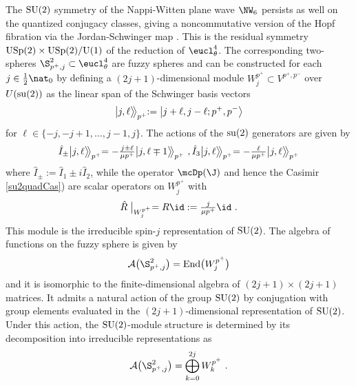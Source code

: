 The ${\rm SU}(2)$ symmetry of the Nappi-Witten plane wave $\NW_6$
persists as well on the quantized conjugacy classes, giving a
noncommutative version of the Hopf fibration via the Jordan-Schwinger
map \cite{G-BLMV1,HLS-J1}. This is the residual symmetry ${\rm
  USp}(2)\times{\rm USp}(2) / {\rm U}(1)$ of the reduction of
$\eucl_\theta^4$. The corresponding
two-spheres $\S_{p^+,j}^2\subset\eucl_\theta^4$ are fuzzy spheres and
can be constructed for each $j\in\frac12 \nat_0$ by defining a
$(2j+1)$-dimensional module $W^{p^+}_j\subset V^{p^+,p^-}$ over
$U({\rm su}(2))$ as the linear span of the Schwinger basis vectors
\begin{equation}
\bigl|j,\ell \bigr\rangle\!\!\!
\bigm\rangle_{p^+}:=\bigl|j+\ell,j-\ell;p^+,p^-\bigr\rangle
\label{fuzzybasisdef}\end{equation}
for $\ell\in\{-j,-j+1,\dots,j-1,j\}$. The actions of the ${\rm su}(2)$
generators are given by
\begin{equation}
\hat I_\pm\bigl|j,\ell \bigr\rangle\!\!\!
\bigm\rangle_{p^+}=-\mbox{$\frac{j\pm\ell}
{\mu p^+}$} \bigl|j,\ell\mp1 \bigr\rangle\!\!\!\bigm\rangle_{p^+} \ ,   
\hat I_3\bigl|j,\ell \bigr\rangle\!\!\!\bigm\rangle_{p^+}
=-\mbox{$\frac\ell{\mu p^+}$} 
\bigl|j,\ell \bigr\rangle\!\!\!\bigm\rangle_{p^+}
\label{su2irrepaction}\end{equation}
where $\hat I_\pm:=\hat I_1\pm i\hat I_2$, while the operator
$\mcDp(\J )$ and hence the Casimir \eqref{su2quadCas}) are scalar
operators on $W_j^{p^+}$ with
\begin{equation}
\hat R\bigm|_{W_j^{p^+}}=R \id:=\mbox{$\frac j{\mu p^+}$} \id \ .
\label{quadCasscalar}\end{equation}
This module is the irreducible spin-$j$ representation of ${\rm
  SU}(2)$. The algebra of functions on the fuzzy sphere is given by
\begin{equation}
\mathcal{A}\bigl(\S^2_{p^+,j}\bigr)={\rm End}\bigl(W^{p^+}_j\bigr)
\label{fuzzyfns}\end{equation}
and it is isomorphic to the finite-dimensional algebra of
$(2j+1)\times(2j+1)$ matrices. It admits a natural action of the group
${\rm SU}(2)$ by conjugation with group elements evaluated in the
$(2j+1)$-dimensional representation of ${\rm SU}(2)$. Under this
action, the ${\rm SU}(2)$-module structure is determined by its
decomposition into irreducible representations as
\begin{equation}
\mathcal{A}\bigl(\S^2_{p^+,j}\bigr)=\bigoplus_{k=0}^{2j}W_k^{p^+} \ .
\label{fuzzyfnsmodule}\end{equation}

